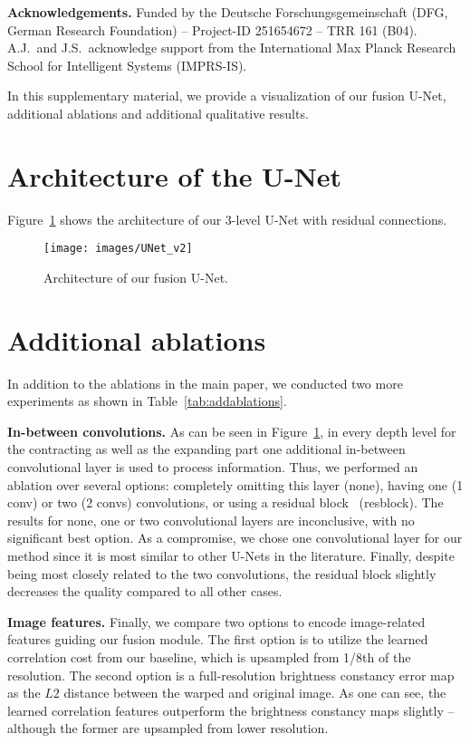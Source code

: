 \documentclass[10pt,twocolumn,letterpaper]{article}
\begin{document}
\medskip
\noindent
\textbf{Acknowledgements.}
Funded by the Deutsche Forschungsgemeinschaft (DFG, German Research Foundation) -- Project-ID 251654672 -- TRR 161 (B04).
A.J.\ and J.S.\ acknowledge support from the International Max Planck Research School for Intelligent Systems (IMPRS-IS).


{\small


}

\clearpage
\appendix

In this supplementary material, we provide a visualization of our fusion U-Net, additional ablations and additional qualitative results.

\section{Architecture of the U-Net}
Figure~\ref{fig:UNet} shows the architecture of our 3-level U-Net with residual connections.
\begin{figure}[h!]
    \centering
    \texttt{[image: images/UNet\_v2]}
    \caption{Architecture of our fusion U-Net.}
    \label{fig:UNet}
\end{figure}


\section{Additional ablations}
In addition to the ablations in the main paper, we conducted two more experiments as shown in Table~\ref{tab:addablations}.

\medskip
\noindent
\textbf{In-between convolutions.}
As can be seen in Figure~\ref{fig:UNet}, in every depth level for the contracting as well as the expanding part one additional in-between convolutional layer is used to process information.
Thus, we performed an ablation over several options: completely omitting this layer (none), having one (1 conv) or two (2 convs) convolutions, or using a residual block~\cite{He2016_ResNet} (resblock).
The results for none, one or two convolutional layers are inconclusive, with no significant best option.
As a compromise, we chose one convolutional layer for our method since it is most similar to other U-Nets in the literature.
Finally, despite being most closely related to the two convolutions, the residual block slightly decreases the quality compared to all other cases.



\medskip
\noindent
\textbf{Image features.}
Finally, we compare two options to encode image-related features guiding our fusion module.
The first option is to utilize the learned correlation cost from our baseline, which is upsampled from 1/8th of the resolution.
The second option is a full-resolution brightness constancy error map~\cite{Ren2019_FlowTemporalFusion} as the $L2$ distance between the warped and original image.
As one can see, the learned correlation features outperform the brightness constancy maps slightly -- although the former are upsampled from lower resolution.
\end{document}
